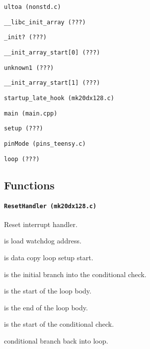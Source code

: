\hspace{8mm} \texttt{ultoa (nonstd.c)}

\hspace{2mm} \texttt{\_\_libc\_init\_array (???)}

\hspace{4mm} \texttt{\_init? (???)}

\hspace{4mm} \texttt{\_\_init\_array\_start[0] (???)}

\hspace{6mm} \texttt{unknown1 (???)}

\hspace{4mm} \texttt{\_\_init\_array\_start[1] (???)}

\hspace{2mm} \texttt{startup\_late\_hook (mk20dx128.c)}

\hspace{2mm} \texttt{main (main.cpp)}

\hspace{4mm} \texttt{setup (???)}

\hspace{6mm} \texttt{pinMode (pins\_teensy.c)}

\hspace{4mm} \texttt{loop (???)}

\subsection{Functions}

\paragraph{\texttt{ResetHandler (mk20dx128.c)}} Reset interrupt handler.

 is load watchdog address.

\vspace{1em}

 is data copy loop setup start.

 is the initial branch into the conditional check.

 is the start of the loop body.

 is the end of the loop body.

 is the start of the conditional check.

 conditional branch back into loop.

